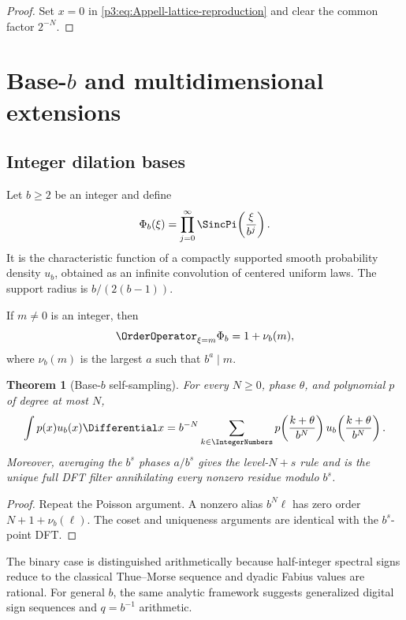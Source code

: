 \documentclass[11pt,oneside]{article}
\numberwithin{equation}{section}
\newtheorem{theorem}{Theorem}[section]
\theoremstyle{definition}
\theoremstyle{remark}
\begin{document}
\begin{proof}
Set $x=0$ in \eqref{p3:eq:Appell-lattice-reproduction} and clear the common factor $2^{-N}$.
\end{proof}

\section{Base-$b$ and multidimensional extensions}
\label{p3:sec:extensions}

\subsection{Integer dilation bases}

Let $b\ge2$ be an integer and define
\begin{equation}
 \Phi_b(\xi)=\prod_{j=0}^{\infty}
 \SincPi\!\left(\frac{\xi}{b^j}\right).
 \label{p3:eq:Phi-b}
\end{equation}
It is the characteristic function of a compactly supported smooth probability density $u_b$, obtained as an infinite convolution of centered uniform laws.  The support radius is $b/(2(b-1))$.

If $m\ne0$ is an integer, then
\begin{equation}
 \OrderOperator_{\xi=m}\Phi_b=1+\nu_b(m),
 \label{p3:eq:b-multiplicity}
\end{equation}
where $\nu_b(m)$ is the largest $a$ such that $b^a\mid m$.

\begin{theorem}[Base-$b$ self-sampling]
\label{p3:thm:base-b}
For every $N\ge0$, phase $\theta$, and polynomial $p$ of degree at most $N$,
\begin{equation}
 \int p(x)u_b(x)\Differential x
 =b^{-N}\sum_{k\in\IntegerNumbers}
 p\!\left(\frac{k+\theta}{b^N}\right)
 u_b\!\left(\frac{k+\theta}{b^N}\right).
 \label{p3:eq:base-b-self-sampling}
\end{equation}
Moreover, averaging the $b^s$ phases $a/b^s$ gives the level-$N+s$ rule and is the unique full DFT filter annihilating every nonzero residue modulo $b^s$.
\end{theorem}

\begin{proof}
Repeat the Poisson argument.  A nonzero alias $b^N\ell$ has zero order $N+1+\nu_b(\ell)$.  The coset and uniqueness arguments are identical with the $b^s$-point DFT.
\end{proof}

The binary case is distinguished arithmetically because half-integer spectral signs reduce to the classical Thue--Morse sequence and dyadic Fabius values are rational.  For general $b$, the same analytic framework suggests generalized digital sign sequences and $q=b^{-1}$ arithmetic.
\end{document}
